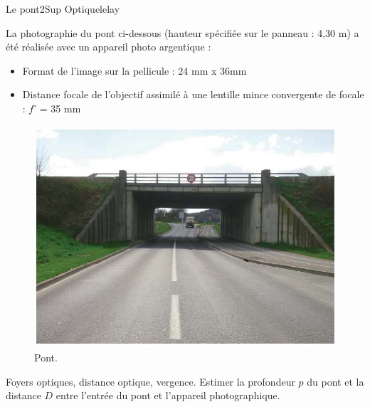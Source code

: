 \begin{exercise}{Le pont}{2}{Sup}
{Optique}{lelay}

La photographie du pont ci-dessous (hauteur spécifiée sur le panneau : 4,30 m) a été réalisée avec un appareil photo 
argentique :
\begin{itemize}
    \item Format de l’image sur la pellicule : 24 mm x 36mm
    \item Distance focale de l’objectif assimilé à une lentille mince convergente de focale : $f’$ = 35 mm
\end{itemize}

\begin{figure}[H]
    \centering
    \includegraphics[width=1.\linewidth]{optique/optiquegeometrique/POOOOOOONT.jpg}
    \caption{Pont.}
\end{figure}

\begin{questions}
    \questioncours Foyers optiques, distance optique, vergence.
    \question Estimer la profondeur $p$ du pont et la distance $D$ entre l'entrée du pont et l'appareil photographique.
\end{questions}

\end{exercise}